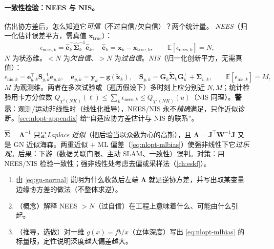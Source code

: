 \paragraph{一致性检验：NEES 与 NIS。}\cite{barfoot2024state}
估出协方差后，怎么知道它\emph{可信}（不过自信/欠自信）？两个统计量。
\emph{NEES}（归一化估计误差平方，需真值 $\mathbf{x}_{\text{true}}$）：
\begin{equation}
  \epsilon_{\text{nees},k}=\hat{\mathbf{e}}_k^\top\hat{\boldsymbol{\Sigma}}_k^{-1}\hat{\mathbf{e}}_k,\quad \hat{\mathbf{e}}_k=\hat{\mathbf{x}}_k-\mathbf{x}_{\text{true},k},\qquad \mathbb{E}[\epsilon_{\text{nees},k}]=N,
  \label{eq:nlopt-nees}
\end{equation}
$N$ 为状态维。$<N$ 为\emph{欠自信}、$>N$ 为\emph{过自信}。\emph{NIS}（归一化创新平方，无需真值）：
\begin{equation}
  \epsilon_{\text{nis},k}=\mathbf{e}_{y,k}^\top\mathbf{S}_{y,k}^{-1}\mathbf{e}_{y,k},\quad \mathbf{e}_{y,k}=\mathbf{y}_k-\mathbf{g}(\check{\mathbf{x}}_k),\quad \mathbf{S}_{y,k}=\mathbf{G}_k\check{\boldsymbol{\Sigma}}_k\mathbf{G}_k^\top+\boldsymbol{\Sigma}_{v,k},\qquad \mathbb{E}[\epsilon_{\text{nis},k}]=M,
  \label{eq:nlopt-nis}
\end{equation}
$M$ 为观测维。两者在多次试验或（遍历假设下）多时刻上应分别近 $N,M$；统计检验用卡方分位数 $Q_{\chi^2(NK)}(\ell)\le\sum_k\epsilon_{\text{nees},k}\le Q_{\chi^2(NK)}(u)$（NIS 同理）。\textbf{警示}：观测/运动非线性时（线性化推导），NEES/NIS 永不\emph{精确}满足，只作近似诊断\cite{barfoot2024state}。\cref{sec:nlopt-appendix} 给“自适应协方差估计与 NIS 的联系”。

\begin{pitfall}
$\hat{\boldsymbol{\Sigma}}=\boldsymbol{\Lambda}^{-1}$ 只是\emph{Laplace 近似}（把后验当以众数为心的高斯），且 $\boldsymbol{\Lambda}=\mathbf{J}^\top\mathbf{W}^{-1}\mathbf{J}$ 又是 GN 近似海森。两重近似 $+$ ML 偏差（\cref{eq:nlopt-mlbias}）使强非线性下它\emph{过乐观}。后果：下游（数据关联门限、主动 SLAM、一致性）误判。对策：用 NEES/NIS 检验一致性；强非线性处考虑去偏或采样法（\cref{ch:eskf}）。
\end{pitfall}

\begin{practice}
\begin{enumerate}
  \item 由 \cref{eq:gn-normal} 说明为什么收敛后左端 $\boldsymbol{\Lambda}$ 就是逆协方差，并写出取某变量边缘协方差的做法（不整体求逆）。
  \item （概念）解释 NEES $>N$（过自信）在工程上意味着什么、可能由什么引起。
  \item （推导，选做）对一维 $g(x)=fb/x$（立体深度）写出 \cref{eq:nlopt-mlbias} 的标量版，定性说明深度越大偏差越大。
\end{enumerate}
\end{practice}

